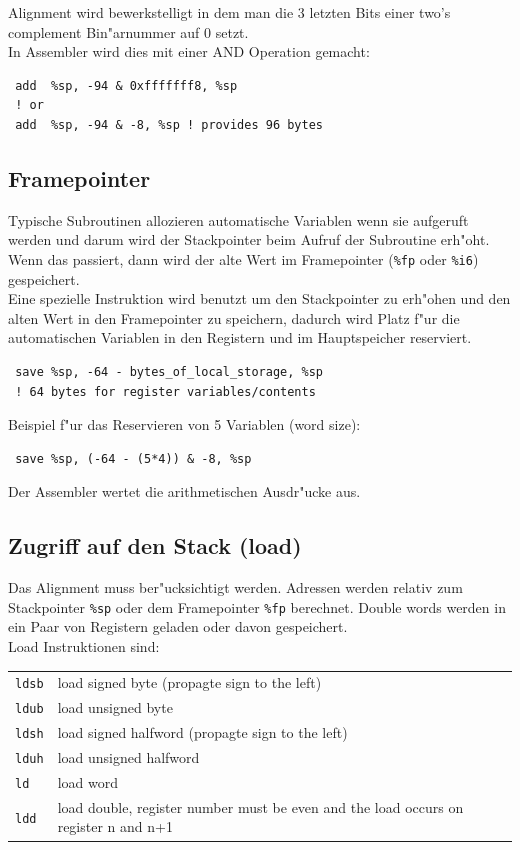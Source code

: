 \documentclass[german, 10pt, a4paper, twocolumn]{scrartcl}
\begin{document}
Alignment wird bewerkstelligt in dem man die 3 letzten Bits einer two's complement Bin"arnummer auf 0 setzt.\\

In Assembler wird dies mit einer AND Operation gemacht:
\begin{verbatim}
 add  %sp, -94 & 0xfffffff8, %sp
 ! or
 add  %sp, -94 & -8, %sp ! provides 96 bytes
\end{verbatim}

\subsection{Framepointer}

Typische Subroutinen allozieren automatische Variablen wenn sie aufgeruft werden und darum wird der Stackpointer beim Aufruf der Subroutine erh"oht. Wenn das passiert, dann wird der alte Wert im Framepointer (\verb#%fp# oder \verb#%i6#) gespeichert.\\

Eine spezielle Instruktion wird benutzt um den Stackpointer zu erh"ohen und den alten Wert in den Framepointer zu speichern, dadurch wird Platz f"ur die automatischen Variablen in den Registern und im Hauptspeicher reserviert.
\begin{verbatim}
 save %sp, -64 - bytes_of_local_storage, %sp
 ! 64 bytes for register variables/contents
\end{verbatim}

Beispiel f"ur das Reservieren von 5 Variablen (word size):
\begin{verbatim}
 save %sp, (-64 - (5*4)) & -8, %sp
\end{verbatim}

Der Assembler wertet die arithmetischen Ausdr"ucke aus.

\subsection{Zugriff auf den Stack (load)}

Das Alignment muss ber"ucksichtigt werden. Adressen werden relativ zum Stackpointer \verb#%sp# oder dem Framepointer \verb#%fp# berechnet. Double words werden in ein Paar von Registern geladen oder davon gespeichert.\\

Load Instruktionen sind:\\

\begin{tabular}{lp{6.5cm}}
	\verb#ldsb# &		load signed byte (propagte sign to the left)\\
	\verb#ldub# &		load unsigned byte\\
	\verb#ldsh# &		load signed halfword (propagte sign to the left)\\
	\verb#lduh# &		load unsigned halfword\\
	\verb#ld# &		load word\\
	\verb#ldd# &		load double, register number must be even and the load occurs on register n and n+1
\end{tabular}\\
\end{document}

